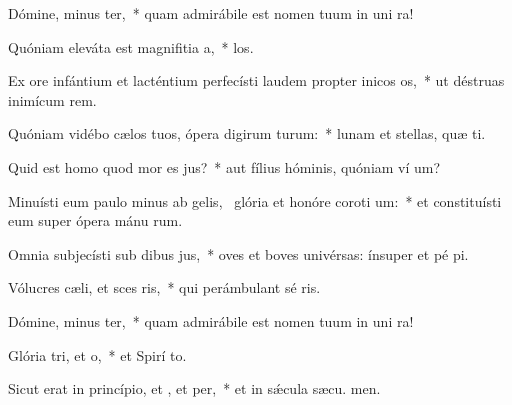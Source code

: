 \item Dómine, minus ter,~* quam admirábile est nomen tuum in uni ra!
\item Quóniam eleváta est magnifitia a,~*  los.
\item Ex ore infántium et lacténtium perfecísti laudem propter inicos os,~* ut déstruas inimícum  rem.
\item Quóniam vidébo cælos tuos, ópera digirum turum:~* lunam et stellas, quæ  ti.
\item Quid est homo quod mor es jus?~* aut fílius hóminis, quóniam ví um?
\item Minuísti eum paulo minus ab gelis,~\pscross{} glória et honóre coroti um:~* et constituísti eum super ópera mánu rum.
\item Omnia subjecísti sub dibus jus,~* oves et boves univérsas: ínsuper et pé pi.
\item Vólucres cæli, et sces ris,~* qui perámbulant sé ris.
\item Dómine, minus ter,~* quam admirábile est nomen tuum in uni ra!
\item Glória tri, et o,~* et Spirí to.
\item Sicut erat in princípio, et , et per,~* et in sǽcula sæcu. men.
